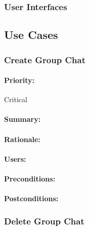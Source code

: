 \documentclass[11pt]{article}
\begin{document}
\subsubsection{User Interfaces}


\subsection{Use Cases}
\subsubsection{Create Group Chat} \label{UC-create-group}
\paragraph{Priority:}Critical
\paragraph{Summary:}
\paragraph{Rationale:}
\paragraph{Users:}
\paragraph{Preconditions:}
\paragraph{{Postconditions:}}
\subsubsection{Delete Group Chat} \label{UC-delete-group}
\end{document}
